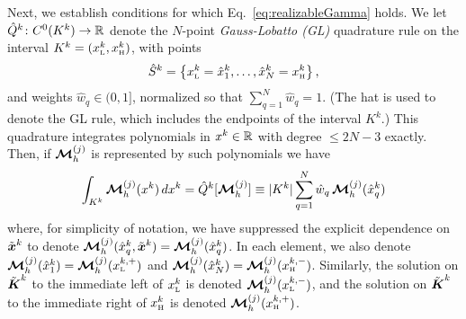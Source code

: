 Next, we establish conditions for which Eq.~\eqref{eq:realizableGamma} holds.  
We let $\hat{Q}^{k}\colon C^{0}(K^{k})\to\mathbb{R}$ denote the $N$-point \emph{Gauss-Lobatto (GL)} quadrature rule on the interval $K^{k}=(x_{\mbox{\tiny L}}^{k},x_{\mbox{\tiny H}}^{k})$, with points
\begin{equation}
  \hat{S}^{k}=\left\{x_{\mbox{\tiny L}}^{k}=\hat{x}_{1}^{k},\ldots,\hat{x}_{N}^{k}=x_{\mbox{\tiny H}}^{k}\right\}, 
  \label{eq:quadraturePointsGL}
\end{equation}
and weights $\hat{w}_{q} \in (0,1]$, normalized so that $\sum_{q=1}^{N} \hat{w}_{q} = 1$.  
(The hat is used to denote the GL rule, which includes the endpoints of the interval $K^{k}$.)
This quadrature integrates polynomials in $x^{k} \in \mathbb{R}$ with degree $\le2N-3$ exactly.  
Then, if $\boldsymbol{\mathcal{M}}_{h}^{(j)}$ is represented by such polynomials we have
\begin{equation}
  \int_{K^{k}} \boldsymbol{\mathcal{M}}_{h}^{(j)}(x^{k})\,dx^{k} = \hat{Q}^{k}[\boldsymbol{\mathcal{M}}_{h}^{(j)}] \equiv
  |K^{k}| \sum_{q=1}^{N} \hat{w}_{q}\,\boldsymbol{\mathcal{M}}_{h}^{(j)}(\hat{x}_{q}^{k})
  \label{eq:quadratureRuleGL}
\end{equation}
where, for simplicity of notation, we have suppressed the explicit dependence on $\tilde{\boldsymbol{x}}^{k}$ to denote $\boldsymbol{\mathcal{M}}_{h}^{(j)}(\hat{x}_q^{k},\tilde{\boldsymbol{x}}^{k}) = \boldsymbol{\mathcal{M}}_{h}^{(j)}(\hat{x}_{q}^{k})$.  
In each element, we also denote $\boldsymbol{\mathcal{M}}_{h}^{(j)}(\hat{x}_{1}^{k})=\boldsymbol{\mathcal{M}}_{h}^{(j)}(x_{\mbox{\tiny L}}^{k,+})$ and $\boldsymbol{\mathcal{M}}_{h}^{(j)}(\hat{x}_{N}^{k})=\boldsymbol{\mathcal{M}}_{h}^{(j)}(x_{\mbox{\tiny H}}^{k,-})$.  
Similarly, the solution on $\tilde{\boldsymbol{\boldsymbol{K}}}^{k}$ to the immediate left of $x_{\mbox{\tiny L}}^{k}$ is denoted $\boldsymbol{\mathcal{M}}_{h}^{(j)}(x_{\mbox{\tiny L}}^{k,-})$, and the solution on $\tilde{\boldsymbol{\boldsymbol{K}}}^{k}$ to the immediate right of $x_{\mbox{\tiny H}}^{k}$ is denoted $\boldsymbol{\mathcal{M}}_{h}^{(j)}(x_{\mbox{\tiny H}}^{k,+})$.  


